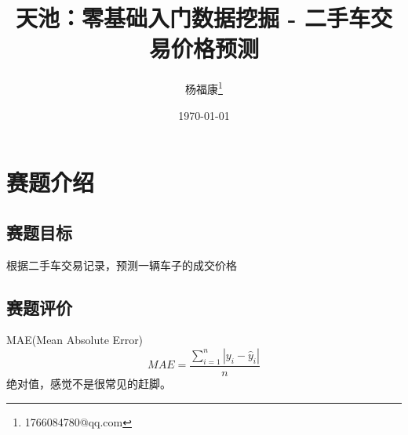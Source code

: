 \documentclass{article}
\title{天池：零基础入门数据挖掘 - 二手车交易价格预测}
\author{杨福康\thanks{1766084780@qq.com}}
\date{\today}
\begin{document}
	\maketitle
	\section{赛题介绍}
	\subsection{赛题目标}
	根据二手车交易记录，预测一辆车子的成交价格
	\subsection{赛题评价}
	MAE(Mean Absolute Error)
	\begin{equation}
		MAE = \frac{\sum_{i=1}^{n}|y_i -\hat{y}_i|}{n}
	\end{equation}
	绝对值，感觉不是很常见的赶脚。
\end{document}
